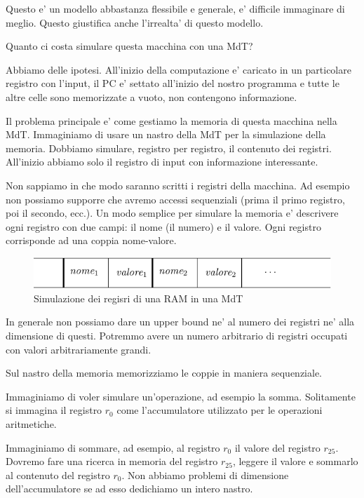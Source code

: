 Questo e' un modello abbastanza flessibile e generale, e' difficile immaginare di meglio. Questo
giustifica anche l'irrealta' di questo modello.

Quanto ci costa simulare questa macchina con una MdT? 

Abbiamo delle ipotesi. All'inizio della computazione e' caricato in un particolare registro con
l'input, il PC e' settato all'inizio del nostro programma e tutte le altre celle sono memorizzate a
vuoto, non contengono informazione.

Il problema principale e' come gestiamo la memoria di questa macchina nella MdT. Immaginiamo di
usare un nastro della MdT per la simulazione della memoria. Dobbiamo simulare, registro per
registro, il contenuto dei registri. All'inizio abbiamo solo il registro di input con informazione
interessante.

Non sappiamo in che modo saranno scritti i registri della macchina. Ad esempio non possiamo supporre
che avremo accessi sequenziali (prima il primo registro, poi il secondo, ecc.). Un modo semplice per
simulare la memoria e' descrivere ogni registro con due campi: il nome (il numero) e il valore. Ogni
registro corrisponde ad una coppia nome-valore.

\begin{figure}[h]
    \begin{center}
        \includegraphics{./img/RAMsimulation.pdf}
        \caption{Simulazione dei regisri di una RAM in una MdT}
    \end{center}
\end{figure}

In generale non possiamo dare un upper bound ne' al numero dei registri ne' alla dimensione di
questi. Potremmo avere un numero arbitrario di registri occupati con valori arbitrariamente grandi.

Sul nastro della memoria memorizziamo le coppie in maniera sequenziale.

Immaginiamo di voler simulare un'operazione, ad esempio la somma. Solitamente si immagina il
registro $r_{0}$ come l'accumulatore utilizzato per le operazioni aritmetiche.

Immaginiamo di sommare, ad esempio, al registro $r_{0}$ il valore del registro $r_{25}$. Dovremo
fare una ricerca in memoria del registro $r_{25}$, leggere il valore e sommarlo al contenuto del
registro $r_{0}$. Non abbiamo problemi di dimensione dell'accumulatore se ad esso dedichiamo un
intero nastro.

